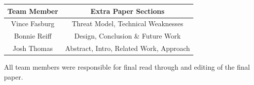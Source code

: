 \documentclass[pagenumbers]{ieee}
\begin{document}
\begin{center}
	\begin{tabular}{ | c | c | }
		\hline \textbf{Team Member} & \textbf{Extra Paper Sections} \\ \hline
		Vince Fasburg & Threat Model, Technical Weaknesses \\ \hline
		Bonnie Reiff &  Design, Conclusion \& Future Work \\ \hline
		Josh Thomas & Abstract, Intro, Related Work, Approach  \\ \hline
	\end{tabular}
\end{center}

 All team members were responsible for final read through and editing of the final paper.




\end{document}
